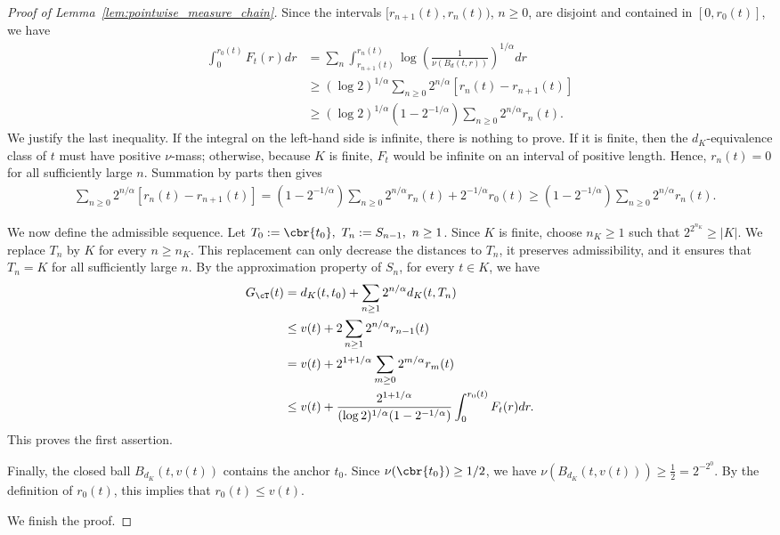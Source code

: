 \documentclass[11pt]{article}
\begin{document}
\begin{proof}[Proof of Lemma~\ref{lem:pointwise_measure_chain}]
Since the intervals
$[r_{n+1}(t),r_n(t))$, $n\ge0$, are disjoint and contained in
$[0,r_0(t)]$, we have
\begin{align*}
\int_0^{r_0(t)}F_t(r)dr&=\sum_{n}\int_{r_{n+1}(t)}^{r_n(t)}\log(\frac{1}{\nu(B_d(t,r))})^{1/\alpha}dr\\
&\ge
(\log2)^{1/\alpha}
\sum_{n\ge0}2^{n/\alpha}
\left[r_n(t)-r_{n+1}(t)\right]\\
&\ge
(\log2)^{1/\alpha}
\left(1-2^{-1/\alpha}\right)
\sum_{n\ge0}2^{n/\alpha}r_n(t).
\end{align*}
We justify the last inequality. If the integral on the
left-hand side is infinite, there is nothing to prove. If it is finite,
then the $d_K$-equivalence class of $t$ must have positive $\nu$-mass;
otherwise, because $K$ is finite, $F_t$ would be infinite on an interval
of positive length. Hence, $r_n(t)=0$ for all sufficiently large $n$.
Summation by parts then gives
\begin{align*}
&\sum_{n\ge0}2^{n/\alpha}
\left[r_n(t)-r_{n+1}(t)\right]=
\left(1-2^{-1/\alpha}\right)
\sum_{n\ge0}2^{n/\alpha}r_n(t)
+2^{-1/\alpha}r_0(t)\ge
\left(1-2^{-1/\alpha}\right)
\sum_{n\ge0}2^{n/\alpha}r_n(t).
\end{align*}

We now define the admissible sequence. Let $T_0:=\cbr{t_0},
\ 
T_n:=S_{n-1},
\ n\ge1$. Since $K$ is finite, choose $n_K\ge1$ such that
$2^{2^{n_K}}\ge|K|$. We replace $T_n$ by $K$ for every
$n\ge n_K$. This replacement can only decrease the distances to $T_n$, it
preserves admissibility, and it ensures that $T_n=K$ for all
sufficiently large $n$. By the approximation property of $S_n$, for
every $t\in K$, we have
\begin{align*}
G_{\cT}(t)
&=
d_K(t,t_0)
+
\sum_{n\ge1}2^{n/\alpha}d_K(t,T_n)\\
&\le
v(t)
+
2\sum_{n\ge1}2^{n/\alpha}r_{n-1}(t)\\
&=
v(t)
+
2^{1+1/\alpha}
\sum_{m\ge0}2^{m/\alpha}r_m(t)\\
&\le
v(t)
+
\frac{2^{1+1/\alpha}}
{(\log2)^{1/\alpha}(1-2^{-1/\alpha})}
\int_0^{r_0(t)}F_t(r)dr.
\end{align*}
This proves the first assertion.

Finally, the closed ball $B_{d_K}(t,v(t))$ contains the anchor
$t_0$. Since $\nu(\cbr{t_0})\ge1/2$, we have $\nu(B_{d_K}(t,v(t)))\ge\frac12=2^{-2^0}$.
By the definition of $r_0(t)$, this implies that $r_0(t)\le v(t)$.

We finish the proof.
\end{proof}
\end{document}
